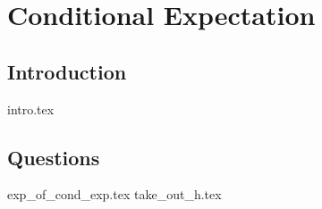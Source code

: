 \documentclass{exam}
\begin{document}

\section{Conditional Expectation}
\subsection{Introduction}
{intro.tex}
\subsection{Questions}
\begin{questions}
{exp_of_cond_exp.tex}
{take_out_h.tex}
\end{questions}
\end{document}
